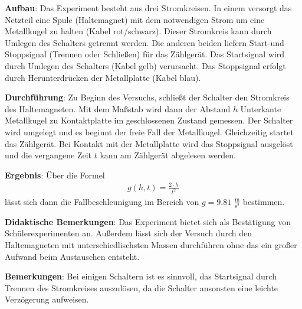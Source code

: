 \documentclass[../main.tex]{subfiles}
\begin{document}
\begin{tcolorbox}
    \vspace{0.5cm}
    \textbf{Aufbau}: Das Experiment besteht aus drei Stromkreisen. In einem versorgt das Netzteil eine Spule (Haltemagnet) mit dem notwendigen Strom um eine Metallkugel zu halten (Kabel rot/schwarz). Dieser Stromkreis kann durch Umlegen des Schalters getrennt werden. Die anderen beiden liefern Start-und Stoppsignal (Trennen oder Schließen) für das Zählgerät. Das Startsignal wird durch Umlegen des Schalters (Kabel gelb) verursacht. Das Stoppsignal erfolgt durch Herunterdrücken der Metallplatte (Kabel blau).
    
    \vspace{0.5cm}
    \textbf{Durchführung}: Zu Beginn des Versuchs, schließt der Schalter den Stromkreis des Haltemagneten. Mit dem Maßstab wird dann der Abstand $h$ \glqq Unterkante  Metallkugel\grqq{} zu \glqq Kontaktplatte im geschlossenen Zustand\grqq{} gemessen. Der Schalter wird umgelegt und es beginnt der freie Fall der Metallkugel. Gleichzeitig startet das Zählgerät. Bei Kontakt mit der Metallplatte wird das Stoppsignal ausgelöst und die vergangene Zeit $t$ kann am Zählgerät abgelesen werden.  

    \vspace{0.5cm}
    \textbf{Ergebnis}: Über die Formel
    \begin{align*}
        g(h,t) = \frac{2 \cdot h}{t^2}
    \end{align*}
    lässt sich dann die Fallbeschleunigung im Bereich von $g=9.81 \,\, \frac{\text{m}}{\text{s}^2}$ bestimmen. 
    
    \vspace{0.5cm}
    \textbf{Didaktische Bemerkungen}: Das Experiment bietet sich als Bestätigung von Schülerexperimenten an. Außerdem lässt sich der Versuch durch den Haltemagneten mit unterschiedlischsten Massen durchführen ohne das ein großer Aufwand beim Austauschen entsteht.

    \vspace{0.5cm}
    \textbf{Bemerkungen}: Bei einigen Schaltern ist es sinnvoll, das Startsignal durch Trennen des Stromkreises auszulösen, da die Schalter ansonsten eine leichte Verzögerung aufweisen.

    \vspace{0cm}
\end{tcolorbox}
\end{document}
